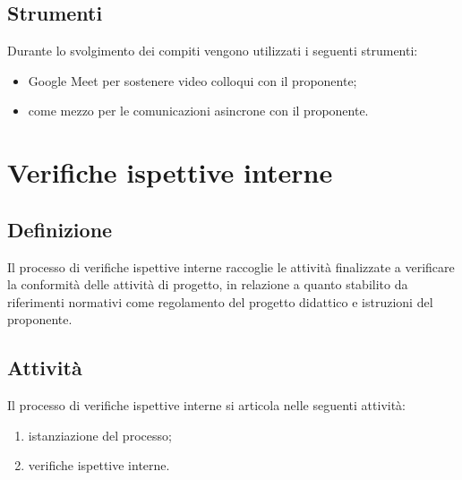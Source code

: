 \subsection{Strumenti}
Durante lo svolgimento dei compiti vengono utilizzati i seguenti strumenti:
\begin{itemize}
    \item Google Meet per sostenere video colloqui con il proponente;
    \item {} come mezzo per le comunicazioni asincrone con il proponente.
\end{itemize}
\newpage

\section{Verifiche ispettive interne} \label{sec:verificheispettive}
\subsection{Definizione}
Il processo di verifiche ispettive interne raccoglie le attività finalizzate a verificare la conformità delle attività di progetto, in relazione a quanto stabilito da riferimenti normativi come regolamento del progetto didattico e istruzioni del proponente.
\subsection{Attività}
Il processo di verifiche ispettive interne si articola nelle seguenti attività:
\begin{enumerate}
    \item istanziazione del processo;
    \item verifiche ispettive interne.
\end{enumerate}
